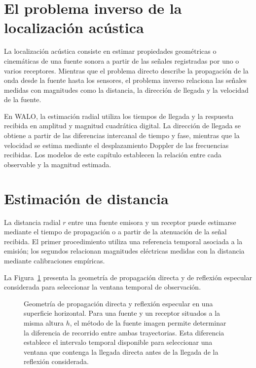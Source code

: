 \label{chap:modelos_inversion}

\section{El problema inverso de la localización acústica}

La localización acústica consiste en estimar propiedades geométricas o
cinemáticas de una fuente sonora a partir de las señales registradas por
uno o varios receptores. Mientras que el problema directo describe la
propagación de la onda desde la fuente hasta los sensores, el problema
inverso relaciona las señales medidas con magnitudes como la distancia,
la dirección de llegada y la velocidad de la fuente.

En WALO, la estimación radial utiliza los tiempos de llegada y la
respuesta recibida en amplitud y magnitud cuadrática digital. La
dirección de llegada se obtiene a partir de las diferencias intercanal
de tiempo y fase, mientras que la velocidad se estima mediante el
desplazamiento Doppler de las frecuencias recibidas. Los modelos de este
capítulo establecen la relación entre cada observable y la magnitud
estimada.

\section{Estimación de distancia}

La distancia radial $r$ entre una fuente emisora y un receptor puede
estimarse mediante el tiempo de propagación o a partir de la atenuación
de la señal recibida. El primer procedimiento utiliza una referencia
temporal asociada a la emisión; los segundos relacionan magnitudes
eléctricas medidas con la distancia mediante calibraciones empíricas.

La Figura~\ref{fig:geometria_cuasi_anecoica} presenta la geometría de
propagación directa y de reflexión especular considerada para seleccionar
la ventana temporal de observación.

\begin{figure}[!htbp]
    \centering
    
    \vspace{0.25cm}
    \caption{Geometría de propagación directa y reflexión especular
    en una superficie horizontal. Para una fuente y un receptor
    situados a la misma altura $h$, el método de la fuente imagen
    permite determinar la diferencia de recorrido entre ambas
    trayectorias. Esta diferencia establece el intervalo temporal
    disponible para seleccionar una ventana que contenga la llegada
    directa antes de la llegada de la reflexión considerada.}
    \label{fig:geometria_cuasi_anecoica}
\end{figure}

